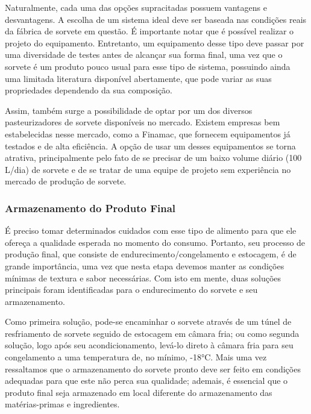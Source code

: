 \documentclass[10pt,a4paper]{article}
\begin{document}
Naturalmente, cada uma das opções supracitadas possuem vantagens e desvantagens. A escolha de um sistema ideal deve ser baseada nas condições reais da fábrica de sorvete em questão. É importante notar que é possível realizar o projeto do equipamento. Entretanto, um equipamento desse tipo deve passar por uma diversidade de testes antes de alcançar sua forma final, uma vez que o sorvete é um produto pouco usual para esse tipo de sistema, possuindo ainda uma limitada literatura disponível abertamente, que pode variar as suas propriedades dependendo da sua composição. 

Assim,  também surge a possibilidade de optar por um dos diversos pasteurizadores de sorvete disponíveis no mercado. Existem empresas bem estabelecidas nesse mercado, como a Finamac, que fornecem equipamentos já testados e de alta eficiência. A opção de usar um desses equipamentos se torna atrativa, principalmente pelo fato de se precisar de um baixo volume diário (100 L/dia) de sorvete e de se tratar de uma equipe de projeto sem experiência no mercado de produção de sorvete.

\subsubsection{{ Armazenamento do Produto Final}}

 É preciso tomar determinados cuidados com esse tipo de alimento para que ele ofereça a qualidade esperada no momento do consumo. Portanto, seu processo de produção final, que consiste de endurecimento/congelamento e estocagem, é de grande importância, uma vez que nesta etapa devemos manter as condições mínimas de textura e sabor necessárias. Com isto em mente, duas soluções principais foram identificadas para o endurecimento do sorvete e seu armazenamento. 
 
 Como primeira solução, pode-se encaminhar o sorvete através de um túnel de resfriamento de sorvete seguido de estocagem em câmara fria; ou como segunda solução, logo após seu acondicionamento, levá-lo direto à câmara fria para seu congelamento a uma temperatura de, no mínimo, -18°C. Mais uma vez ressaltamos que o armazenamento do sorvete pronto deve ser feito em condições adequadas para que este não perca sua qualidade; ademais, é essencial que o produto final seja armazenado em local diferente do armazenamento das matérias-primas e ingredientes.
\end{document}
